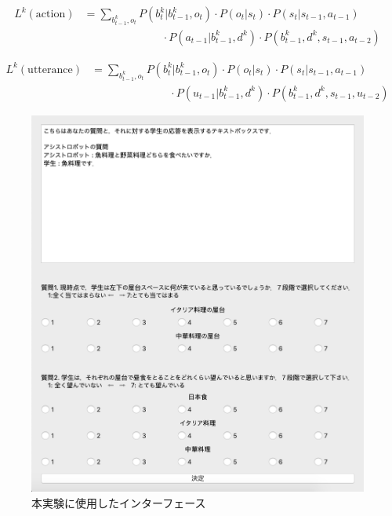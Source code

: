 \begin{equation}
  \begin{split}
  \label{uiom_a}
  L^k({\mathrm{action}})&= \sum_{b_{t-1}^k,o_t}P(b_t^k|b_{t-1}^k,o_t)\cdot P(o_t|s_t)\cdot P(s_t|s_{t-1},a_{t-1})\\
  &\hspace{3cm}\cdot P(a_{t-1}|b_{t-1}^k,d^k)\cdot P(b_{t-1}^k,d^k,s_{t-1},a_{t-2})
  \end{split}
\end{equation}

\begin{equation}
  \begin{split}
  \label{uiom_u}
  L^k({\mathrm{utterance}})&= \sum_{b_{t-1}^k,o_t}P(b_t^k|b_{t-1}^k,o_t)\cdot P(o_t|s_t)\cdot P(s_t|s_{t-1},a_{t-1})\\
  &\hspace{3cm}\cdot P(u_{t-1}|b_{t-1}^k,d^k)\cdot P(b_{t-1}^k,d^k,s_{t-1},u_{t-2})
  \end{split}
\end{equation}

\begin{figure}[htbp]
  \begin{center}
    \includegraphics[scale=0.6]{./interface.pdf}
    \caption{本実験に使用したインターフェース}
    \label{fig:interface}
  \end{center}
\end{figure}

